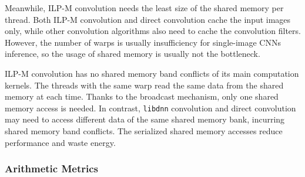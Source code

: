 \documentclass{article}
\begin{document}
Meanwhile, ILP-M convolution needs the least size of the shared memory per thread. Both ILP-M convolution and direct convolution cache the input images only, while other convolution algorithms also need to cache the convolution filters. However, the number of warps is usually insufficiency for single-image CNNs inference, so the usage of shared memory is usually not the bottleneck.

ILP-M convolution has no shared memory band conflicts of its main computation kernels. The threads with the same warp read the same data from the shared memory at each time. Thanks to the broadcast mechanism, only one shared memory access is needed. In contrast, \texttt{libdnn} convolution and direct convolution may need to access different data of the same shared memory bank, incurring shared memory band conflicts. The serialized shared memory accesses reduce performance and waste energy.


\subsubsection{Arithmetic Metrics}
\begin{table}[]
\centering
{}
\caption{Profile Metrics Related to Arithmetic \label{pmra}}
\end{table}
\end{document}
